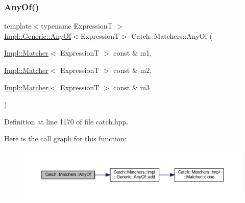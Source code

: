 \subsubsection{\texorpdfstring{Any\+Of()}{AnyOf()}\hspace{0.1cm}{\footnotesize\ttfamily [2/2]}}
{\footnotesize\ttfamily template$<$typename ExpressionT $>$ \\
\hyperlink{class_catch_1_1_matchers_1_1_impl_1_1_generic_1_1_any_of}{Impl\+::\+Generic\+::\+Any\+Of}$<$ExpressionT$>$ Catch\+::\+Matchers\+::\+Any\+Of (\begin{DoxyParamCaption}\item[{\hyperlink{struct_catch_1_1_matchers_1_1_impl_1_1_matcher}{Impl\+::\+Matcher}$<$ ExpressionT $>$ const \&}]{m1,  }\item[{\hyperlink{struct_catch_1_1_matchers_1_1_impl_1_1_matcher}{Impl\+::\+Matcher}$<$ ExpressionT $>$ const \&}]{m2,  }\item[{\hyperlink{struct_catch_1_1_matchers_1_1_impl_1_1_matcher}{Impl\+::\+Matcher}$<$ ExpressionT $>$ const \&}]{m3 }\end{DoxyParamCaption})\hspace{0.3cm}{\ttfamily [inline]}}



Definition at line 1170 of file catch.\+hpp.

Here is the call graph for this function\+:\nopagebreak
\begin{figure}[H]
\begin{center}
\leavevmode
\includegraphics[width=350pt]{namespace_catch_1_1_matchers_a8efb0e533db973b8aff1172fb908db02_cgraph}
\end{center}
\end{figure}
\hypertarget{namespace_catch_1_1_matchers_a07760045eca8bafb7f6618fae10f1b59}{}\label{namespace_catch_1_1_matchers_a07760045eca8bafb7f6618fae10f1b59} 
